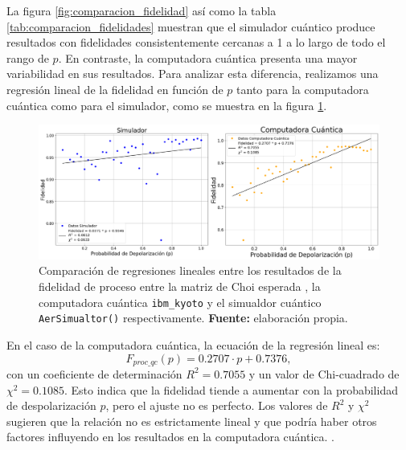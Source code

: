 \documentclass[letterpaper,12pt]{thesisECFM}
\theoremstyle{plain}
\theoremstyle{definition}
\theoremstyle{remark}
\newcommand{\1}{\mathbb{1}}
\begin{document}
La figura \ref{fig:comparacion_fidelidad} así como la tabla
\ref{tab:comparacion_fidelidades} muestran que el simulador cuántico produce
resultados con fidelidades consistentemente cercanas a 1 a lo largo de todo el
rango de $p$. En contraste, la computadora cuántica presenta una mayor
variabilidad en sus resultados. Para analizar esta diferencia, realizamos una
regresión lineal de la fidelidad en función de $p$ tanto para la computadora
cuántica como para el simulador, como se muestra en la figura
\ref{fig:comparacion_regresiones}.

\begin{figure}[h!]
    \centering
    \includegraphics[width=0.95\linewidth]{imagenes/Comparacion_regresiones.png}
    \caption{Comparación de regresiones lineales entre los resultados de la fidelidad de proceso entre la matriz de Choi esperada , la computadora cuántica \texttt{ibm\_kyoto} y el simualdor cuántico \texttt{AerSimualtor()} respectivamente. \textbf{Fuente:} elaboración propia.}
    \label{fig:comparacion_regresiones}
\end{figure}

En el caso de la computadora cuántica, la ecuación de la regresión lineal es:
\begin{equation}
    F_{proc\_qc}(p) = 0.2707 \cdot p + 0.7376,
\end{equation}
con un coeficiente de determinación $R^2 = 0.7055$ y un valor de Chi-cuadrado
de $\chi^2 = 0.1085$.  Esto indica que la fidelidad tiende a aumentar con la probabilidad de despolarización $p$, pero el ajuste no es perfecto. Los valores de $R^2$ y $\chi^2$ sugieren que la relación no es estrictamente lineal y que podría haber otros factores influyendo en los resultados en la computadora cuántica.  . 
\end{document}
